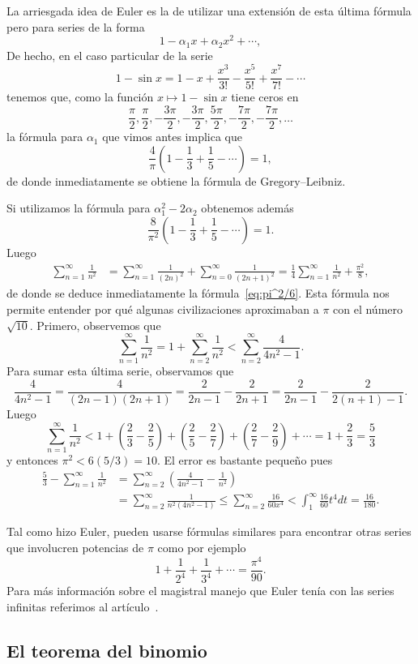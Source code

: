 La arriesgada idea de Euler es la de utilizar una extensión de esta última
fórmula pero para series de la forma
\[
	1-\alpha_1x+\alpha_2x^2+\cdots,
\]
De hecho, en el caso particular de la serie
\[
	1-\sin x=1-x+\frac{x^3}{3!}-\frac{x^5}{5!}+\frac{x^7}{7!}-\cdots
\]
tenemos que, como la función $x\mapsto 1-\sin x$ tiene ceros en 
\[
	\frac{\pi}{2},\frac{\pi}{2},-\frac{3\pi}{2},-\frac{3\pi}{2},\frac{5\pi}{2},-\frac{7\pi}{2},-\frac{7\pi}{2},\dots
\]
la fórmula para $\alpha_1$ que vimos antes implica que
\[
	\frac{4}{\pi}\left(1-\frac13+\frac15-\cdots\right)=1,
\]
de donde inmediatamente se obtiene la fórmula de Gregory--Leibniz.  

Si utilizamos la
fórmula para $\alpha_1^2-2\alpha_2$ obtenemos además 
\[
	\frac{8}{\pi^2}\left(1-\frac13+\frac15-\cdots\right)=1.
\]
Luego
\begin{align*}
	\sum_{n=1}^\infty\frac{1}{n^2} &= \sum_{n=1}^\infty\frac{1}{(2n)^2}+\sum_{n=0}^\infty\frac{1}{(2n+1)^2}=\frac14\sum_{n=1}^\infty\frac{1}{n^2}+\frac{\pi^2}{8},
\end{align*}
de donde se deduce inmediatamente la fórmula~\eqref{eq:pi^2/6}.
Esta fórmula nos permite entender por qué algunas civilizaciones aproximaban a
$\pi$ con el número $\sqrt{10}$. Primero, observemos que 
\[
	\sum_{n=1}^\infty\frac{1}{n^2}=1+\sum_{n=2}^\infty\frac{1}{n^2}<\sum_{n=2}^\infty\frac{4}{4n^2-1}.
\]
Para sumar esta última serie, observamos que
\[
	\frac{4}{4n^2-1}=\frac{4}{(2n-1)(2n+1)}=\frac{2}{2n-1}-\frac{2}{2n+1}=\frac{2}{2n-1}-\frac{2}{2(n+1)-1}.
\]
Luego 
\[
	\sum_{n=1}^\infty\frac{1}{n^2}<1+\left(\frac23-\frac25\right)+\left(\frac25-\frac27\right)+\left(\frac27-\frac29\right)+\cdots=1+\frac23=\frac53
\]
y entonces $\pi^2<6(5/3)=10$. El error es bastante pequeño pues 
\begin{align*}
	\frac53-\sum_{n=1}^\infty\frac{1}{n^2}
	&=\sum_{n=2}^\infty\left(\frac{4}{4n^2-1}-\frac{1}{n^2}\right)\\
	&=\sum_{n=2}^\infty\frac{1}{n^2(4n^2-1)}
	\leq\sum_{n=2}^\infty\frac{16}{60x^4}
	<\int_1^{\infty}\frac{16}{60}t^4dt=\frac{16}{180}.
\end{align*}

Tal como hizo Euler, pueden usarse fórmulas similares para encontrar otras series 
que involucren potencias de $\pi$ como por ejemplo
\[
	1+\frac{1}{2^4}+\frac{1}{3^4}+\cdots=\frac{\pi^4}{90}.
\]
Para más información sobre el magistral manejo que Euler tenía con las series
infinitas referimos al artículo~\cite{MR2338363}.


\subsection*{El teorema del binomio}


